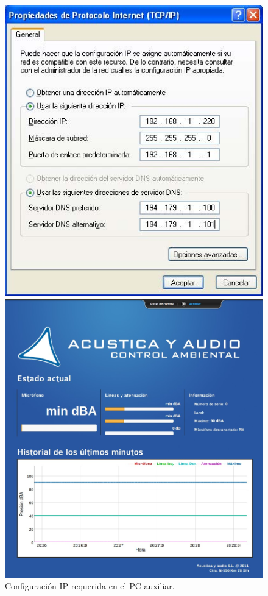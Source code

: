 \begin{figure}[ht]
    \begin{minipage}[t]{.45\textwidth}
        \centering
        \includegraphics[width=1\textwidth]{imagenes/interfaz/lms_ip.jpg}
        \caption{Configuración \acrshort{IP} requerida  en el \acrshort{PC} auxiliar.}
        \label{img:lms_ip}
    \end{minipage}
    \hfill
    \begin{minipage}[t]{.45\textwidth}
        \centering
        \includegraphics[width=1\textwidth]{imagenes/interfaz/lms_ui.jpg}

\end{minipage}
\end{figure}
